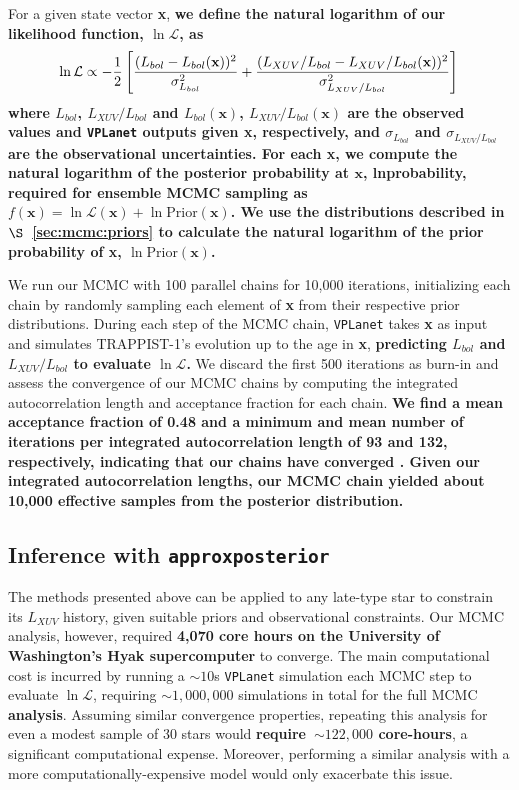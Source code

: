 \documentclass[twocolumn]{aastex62}
\newcommand{\xxx}[1]{{\textbf{#1}}}
\newcommand{\vplanet}[0]{\texttt{VPLanet}\xspace}
\newcommand{\approxposterior}[0]{\texttt{approxposterior}\xspace}
\begin{document}
For a given state vector \textbf{x}, \xxx{we define the natural logarithm of our likelihood function, $\ln \mathcal{L}$, as}
\small
\begin{equation} \label{eqn:lnlike}
    \ln \mathcal{L} \propto -\frac{1}{2} \left[ \frac{(L_{bol} - L_{bol}(\textbf{x}))^2}{\sigma_{L_{bol}}^2} + \frac{(L_{XUV}/L_{bol} - L_{XUV}/L_{bol}(\textbf{x}))^2}{\sigma_{L_{XUV}/L_{bol}}^2} \right] \\
\end{equation}
\normalsize
\xxx{where $L_{bol}$, $L_{XUV}/L_{bol}$ and $L_{bol}(\textbf{x})$, $L_{XUV}/L_{bol}(\textbf{x})$ are the observed values and \vplanet outputs given \textbf{x}, respectively, and $\sigma_{L_{bol}}$ and $\sigma_{L_{XUV}/L_{bol}}$ are the observational uncertainties. For each \textbf{x}, we compute the natural logarithm of the posterior probability at $\textbf{x}$, lnprobability, required for ensemble MCMC sampling as $f(\textbf{x}) = \ln \mathcal{L}(\textbf{x}) + \ln \mathrm{Prior}(\textbf{x})$. We use the distributions described in $\S$~\ref{sec:mcmc:priors} to calculate the natural logarithm of the prior probability of \textbf{x}, $\ln \mathrm{Prior}(\textbf{x})$.} 

We run our MCMC with 100 parallel chains for 10,000 iterations, initializing each chain by randomly sampling each element of \textbf{x} from their respective prior distributions. During each step of the MCMC chain, \vplanet takes \textbf{x} as input and simulates TRAPPIST-1's evolution up to the age in \textbf{x}, \xxx{predicting $L_{bol}$ and $L_{XUV}/L_{bol}$ to evaluate $\ln \mathcal{L}$.} We discard the first 500 iterations as burn-in and assess the convergence of our MCMC chains by computing the integrated autocorrelation length and acceptance fraction for each chain. \xxx{We find a mean acceptance fraction of 0.48 and a minimum and mean number of iterations per integrated autocorrelation length of 93 and 132, respectively, indicating that our chains have converged \citep{ForemanMackey2013}. Given our integrated autocorrelation lengths, our MCMC chain yielded about 10,000 effective samples from the posterior distribution.}

\subsection{Inference with \approxposterior} \label{sec:methods:approx}

The methods presented above can be applied to any late-type star to constrain its $L_{XUV}$ history, given suitable priors and observational constraints. Our MCMC analysis, however, required \xxx{4,070 core hours on the University of Washington's Hyak supercomputer} to converge. The main computational cost is incurred by running a ${\sim}10$s \vplanet simulation each MCMC step to evaluate $\ln \mathcal{L}$, requiring ${\sim}1,000,000$ simulations in total for the full MCMC \xxx{analysis}. Assuming similar convergence properties, repeating this analysis for even a modest sample of 30 stars would \xxx{require~${\sim} 122,000$ core-hours}, a significant computational expense. Moreover, performing a similar analysis with a more computationally-expensive model would only exacerbate this issue.
\end{document}
